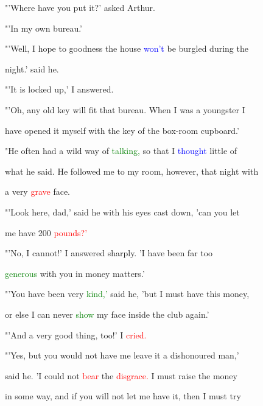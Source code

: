 "'Where have you put it?' asked Arthur.



 "'In my own bureau.'



 "'Well, I \textcolor{BurntOrange}{hope} to \textcolor{BurntOrange}{goodness} the house \textcolor{blue}{won't} be burgled during the

 night.' said he.



 "'It is locked up,' I answered.



 "'Oh, any old key will fit that bureau. When I was a youngster I

 have opened it myself with the key of the box-room cupboard.'



 "He often had a \textcolor{BurntOrange}{wild} way of \textcolor{green}{talking,} so that I \textcolor{blue}{thought} little of

 what he said. He followed me to my room, however, that night with

 a very \textcolor{red}{grave} face.



 "'Look here, dad,' said he with his eyes cast down, 'can you let

 me have 200 \textcolor{red}{pounds?'}



 "'No, I cannot!' I answered sharply. 'I have been far too

 \textcolor{green}{generous} with you in \textcolor{BurntOrange}{money} matters.'



 "'You have been very \textcolor{green}{kind,'} said he, 'but I must have this \textcolor{BurntOrange}{money,}

 or else I can never \textcolor{green}{show} my face inside the club again.'



 "'And a very \textcolor{BurntOrange}{good} thing, too!' I \textcolor{red}{cried.}



 "'Yes, but you would not have me \textcolor{BurntOrange}{leave} it a dishonoured man,'

 said he. 'I could not \textcolor{red}{bear} the \textcolor{red}{disgrace.} I must raise the \textcolor{BurntOrange}{money}

 in some way, and if you will not let me have it, then I must try

